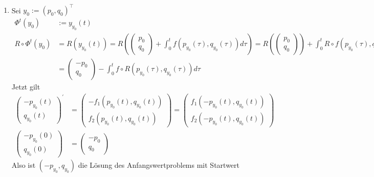 \begin{solution}
\leavevmode \\
\begin{enumerate}[label = \textbf{\alph*)}]
  \item Sei $y_0 := (p_0,q_0)^{\top}$
    \begin{align*}
      \Phi^t(y_0) &:= y_{y_0}(t) \\
      R \circ \Phi^t(y_0) &= R(y_{y_0}(t)) = R\left(
      \begin{pmatrix}
        p_0 \\ q_0
      \end{pmatrix}
      + \int_0^t f(p_{y_0}(\tau),q_{y_0}(\tau)) d\tau\right)
      = R\left(
      \begin{pmatrix}
        p_0 \\ q_0
      \end{pmatrix}\right)
      + \int_0^t R\circ f(p_{y_0}(\tau),q_{y_0}(\tau)) d\tau\\
      &= \begin{pmatrix}
        -p_0 \\ q_0
      \end{pmatrix}
      - \int_0^t f\circ R(p_{y_0}(\tau),q_{y_0}(\tau)) d\tau
    \end{align*}
    Jetzt gilt
    \begin{align*}
      \begin{pmatrix}
        -p_{y_0}(t) \\ q_{y_0}(t)
      \end{pmatrix}^{\prime}
      &= \begin{pmatrix}
        -f_1(p_{y_0}(t),q_{y_0}(t)) \\ f_2(p_{y_0}(t),q_{y_0}(t))
      \end{pmatrix}
      = \begin{pmatrix}
        f_1(-p_{y_0}(t),q_{y_0}(t)) \\ f_2(-p_{y_0}(t),q_{y_0}(t))
      \end{pmatrix} \\
      \begin{pmatrix}
        -p_{y_0}(0) \\ q_{y_0}(0)
      \end{pmatrix}
      &= \begin{pmatrix}
        -p_0 \\ q_0
      \end{pmatrix}
    \end{align*}
    Also ist $(-p_{y_0},q_{y_0})$ die Lösung des Anfangswertproblems mit Startwert

\end{enumerate}
\end{solution}
